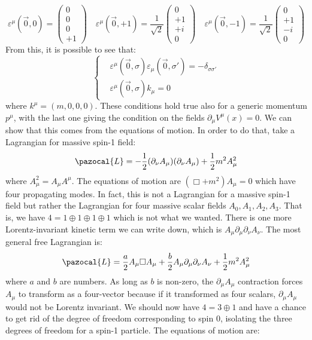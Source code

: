 \documentclass[../main.tex]{subfiles}
\begin{document}
\[
\varepsilon^\mu(\Vec{0},0)=\left(\begin{array}{c}
    0 \\
    0 \\
    0 \\
    +1
\end{array}\right)
\quad
\varepsilon^\mu(\Vec{0},+1)=\frac{1}{\sqrt{2}}\left(\begin{array}{c}
    0 \\
    +1 \\
    +i \\
    0
\end{array}\right)
\quad
\varepsilon^\mu(\Vec{0},-1)=\frac{1}{\sqrt{2}}\left(\begin{array}{c}
    0 \\
    +1 \\
    -i \\
    0
\end{array}\right)
\]
From this, it is possible to see that:
\[
\left\{
\begin{aligned}
&\varepsilon^\mu(\Vec{0},\sigma)\varepsilon_\mu(\Vec{0},\sigma')=-\delta_{\sigma\sigma'}\\
&\varepsilon^\mu(\Vec{0},\sigma)k_\mu=0
\end{aligned}
\right.
\]
where $k^\mu=(m,0,0,0)$. These conditions hold true also for a generic momentum $p^\mu$, with the last one giving the condition on the fields $\partial_\mu V^\mu(x)=0$. We can show that this comes from the equations of motion. In order to do that, take a Lagrangian for massive spin-1 field:
\[
\pazocal{L}=-\frac{1}{2}(\partial_\nu A_\mu)(\partial_\nu A_\mu)+\frac{1}{2}m^2A_\mu^2
\]
where $A_\mu^2=A_\mu A^\mu$. The equations of motion are $(\Box+m^2)A_\mu=0$ which have four propagating modes. In fact, this is not a Lagrangian for a massive spin-1 field but rather the Lagrangian for four massive scalar fields $A_0, A_1, A_2, A_3$. That is, we have $4=1\oplus1\oplus1\oplus1$ which is not what we wanted. There is one more Lorentz-invariant kinetic term we can write down, which is $A_\mu\partial_\mu\partial_\nu A_\nu$. The most general free Lagrangian is:
\[
\pazocal{L}=\frac{a}{2}A_\mu\Box A_\mu+\frac{b}{2}A_\mu\partial_\mu\partial_\nu A_\nu+\frac{1}{2}m^2A_\mu^2
\]
where $a$ and $b$ are numbers. As long as $b$ is non-zero, the $\partial_\mu A_\mu$ contraction forces $A_\mu$ to transform as a four-vector because if it transformed as four scalars, $\partial_\mu A_\mu$ would not be Lorentz invariant. We should now have $4=3\oplus1$ and have a chance to get rid of the degree of freedom corresponding to spin 0, isolating the three degrees of freedom for a spin-1 particle. The equations of motion are:
\end{document}
